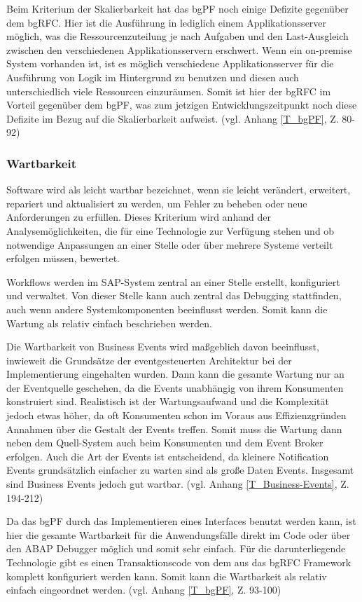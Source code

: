 Beim Kriterium der Skalierbarkeit hat das bgPF noch einige Defizite gegenüber dem bgRFC. Hier ist die Ausführung in lediglich einem Applikationsserver möglich, was die Ressourcenzuteilung je nach Aufgaben und den Last-Ausgleich zwischen den verschiedenen Applikationsservern erschwert. Wenn ein on-premise System vorhanden ist, ist es möglich verschiedene Applikationsserver für die Ausführung von Logik im Hintergrund zu benutzen und diesen auch unterschiedlich viele Ressourcen einzuräumen. Somit ist hier der bgRFC im Vorteil gegenüber dem bgPF, was zum jetzigen Entwicklungszeitpunkt noch diese Defizite im Bezug auf die Skalierbarkeit aufweist. (vgl. Anhang \ref{T_bgPF}, Z. 80-92)

\subsubsection{Wartbarkeit}

Software wird als leicht wartbar bezeichnet, wenn sie leicht verändert, erweitert, repariert und aktualisiert zu werden, um Fehler zu beheben oder neue Anforderungen zu erfüllen. Dieses Kriterium wird anhand der Analysemöglichkeiten, die für eine Technologie zur Verfügung stehen und ob notwendige Anpassungen an einer Stelle oder über mehrere Systeme verteilt erfolgen müssen, bewertet.

Workflows werden im SAP-System zentral an einer Stelle erstellt, konfiguriert und verwaltet. Von dieser Stelle kann auch zentral das Debugging stattfinden, auch wenn andere Systemkomponenten beeinflusst werden. Somit kann die Wartung als relativ einfach beschrieben werden. 

Die Wartbarkeit von Business Events wird ma{\ss}geblich davon beeinflusst, inwieweit die Grundsätze der eventgesteuerten Architektur bei der Implementierung eingehalten wurden. Dann kann die gesamte Wartung nur an der Eventquelle geschehen, da die Events unabhängig von ihrem Konsumenten konstruiert sind. Realistisch ist der Wartungsaufwand und die Komplexität jedoch etwas höher, da oft Konsumenten schon im Voraus aus Effizienzgründen Annahmen über die Gestalt der Events treffen. Somit muss die Wartung dann neben dem Quell-System auch beim Konsumenten und dem Event Broker erfolgen. Auch die Art der Events ist entscheidend, da kleinere Notification Events grundsätzlich einfacher zu warten sind als gro{\ss}e Daten Events. Insgesamt sind Business Events jedoch gut wartbar. (vgl. Anhang \ref{T_Business-Events}, Z. 194-212)

Da das bgPF durch das Implementieren eines Interfaces benutzt werden kann, ist hier die gesamte Wartbarkeit für die Anwendungsfälle direkt im Code oder über den ABAP Debugger möglich und somit sehr einfach. Für die darunterliegende Technologie gibt es einen Transaktionscode von dem aus das bgRFC Framework komplett konfiguriert werden kann. Somit kann die Wartbarkeit als relativ einfach eingeordnet werden. (vgl. Anhang \ref{T_bgPF}, Z. 93-100)

